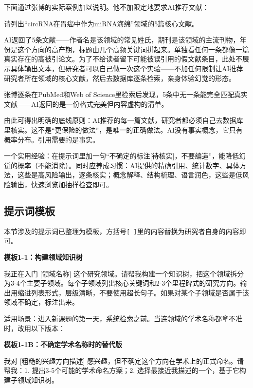 下面通过张博的实际案例加以说明。他不加限定地要求AI推荐文献：

\begin{userbox}
请列出``circRNA在胃癌中作为miRNA海绵''领域的5篇核心文献。
\end{userbox}

\begin{lightquote}
AI返回了5条文献——作者名是该领域的常见姓氏，期刊是该领域的主流刊物，年份是这个方向的高产期，标题由几个高频关键词拼起来。单独看任何一条都像一篇真实存在的高被引论文。为了不给读者留下可能被误引用的假文献条目，此处不展示具体输出文本，但研究者可以自己做一次这个实验——不加任何限制让AI推荐研究者所在领域的核心文献，然后去数据库逐条检索，亲身体验幻觉的形态。

张博逐条在PubMed和Web of Science里检索后发现，5条中无一条能完全匹配真实文献——AI返回的是一份格式完美但内容虚构的清单。
\end{lightquote}

由此可得出明确的底线原则：AI推荐的每一篇文献，研究者都必须自己去数据库里核实。这不是``更保险的做法''，是唯一的正确做法。AI没有事实概念，它只有概率分布。引用需要的是事实。

一个实用经验：在提示词里加一句``不确定的标注[待核实]，不要编造''，能降低幻觉的概率（不能消除）。同时应养成习惯：AI提供的精确引用、统计数字、具体方法，这些是高风险输出，逐条核实；概念解释、结构梳理、语言润色，这些是低风险输出，快速浏览加抽样检查即可。

\subsection*{提示词模板}

本节涉及的提示词已整理为模板，方括号\texttt{[ ]}里的内容替换为研究者自身的内容即可。

\textbf{模板1-1：构建领域知识树}

\begin{tcolorbox}[promptbox]
我正在入门 [领域名称] 这个研究领域。请帮我构建一个知识树，把这个领域拆分为3-4个主要子领域。每个子领域列出核心关键词和2-3个里程碑式的研究方向。输出用缩进列表形式，层级清晰，不要使用超长句子。如果对某个子领域是否属于该领域不确定，标注出来。
\end{tcolorbox}

适用场景：进入新课题的第一天，系统检索之前。当连领域的学术名称都拿不准时，改用以下版本：

\textbf{模板1-1B：不确定学术名称时的替代版}

\begin{tcolorbox}[promptbox]
我对 [粗糙的兴趣方向描述] 感兴趣，但不确定这个方向在学术上的正式命名。请帮我：1. 提出3-5个可能的学术命名方案；2. 选择最接近我描述的一个，基于它构建子领域知识树。
\end{tcolorbox}

